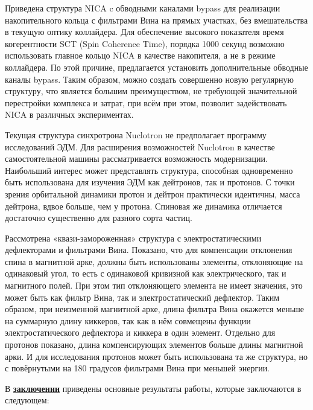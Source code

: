 \par Приведена структура NICA c обводными каналами bypass для реализации накопительного кольца с фильтрами Вина на прямых участках, без вмешательства в текущую оптику коллайдера. Для обеспечение высокого показателя время когерентности SCT (Spin Coherence Time), порядка 1000 секунд возможно использовать главное кольцо NICA в качестве накопителя, а не в режиме коллайдера. По этой причине, предлагается установить дополнительные обводные каналы bypass. Таким образом, можно создать совершенно новую регулярную структуру, что является большим преимуществом, не требующей значительной перестройки комплекса и затрат, при всём при этом, позволит задействовать NICA в различных экспериментах.

\par Текущая структура синхротрона Nuclotron не предполагает программу исследований ЭДМ. Для расширения возможностей Nuclotron в качестве самостоятельной машины рассматривается возможность модернизации. Наибольший интерес может представлять структура, способная одновременно быть использована для изучения ЭДМ как дейтронов, так и протонов. С точки зрения орбитальной динамики протон и дейтрон практически идентичны, масса дейтрона, вдвое больше, чем у протона. Спиновая же динамика отличается достаточно существенно для разного сорта частиц. 

\noindent Рассмотрена «квази-замороженная» структура с электростатическими дефлекторами и фильтрами Вина. Показано, что для компенсации отклонения спина в магнитной арке, должны быть использованы элементы, отклоняющие на одинаковый угол, то есть с одинаковой кривизной как электрического, так и магнитного полей. При этом тип отклоняющего элемента не имеет значения, это может быть как фильтр Вина, так и электростатический дефлектор. Таким образом, при неизменной магнитной арке, длина фильтра Вина окажется меньше на суммарную длину киккеров, так как в нём совмещены функции электростатического дефлектора и киккера в один элемент. Отдельно для протонов показано, длина компенсирующих элементов больше длины магнитной арки. И для исследования протонов может быть использована та же структура, но с повёрнутыми на 180 градусов фильтрами Вина при меньшей энергии. \cite{Kolokolchikov:2021trans}

\FloatBarrier
{}                                  %

В \underline{\textbf{заключении}} приведены основные результаты работы, которые заключаются в следующем:


